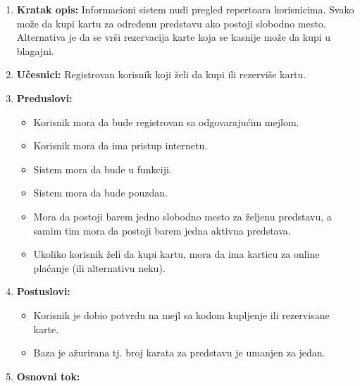 \documentclass[a4paper]{article}
\begin{document}
\begin{enumerate}
  \item \textbf{Kratak opis:} Informacioni sistem nudi pregled repertoara korisnicima. 
        Svako može da kupi kartu za određenu predstavu ako postoji slobodno mesto.
        Alternativa je da se vrši rezervacija karte koja se kasnije može da kupi u blagajni. 
  \item \textbf{Učesnici:} Registrovan korisnik koji želi da kupi ili rezerviše kartu.
  \item \textbf{Preduslovi:} 
        \begin{itemize}
          \item Korisnik mora da bude registrovan sa odgovarajućim mejlom. 
          \item Korisnik mora da ima pristup internetu.
          \item Sistem mora da bude u funkciji.
          \item Sistem mora da bude pouzdan. 
          \item Mora da postoji barem jedno slobodno mesto za željenu predstavu, a samim tim mora da 
                postoji barem jedna aktivna predstava. 
          \item Ukoliko korisnik želi da kupi kartu, mora da ima karticu za online plaćanje (ili 
                alternativu neku).
        \end{itemize}
  \item \textbf{Postuslovi:} 
        \begin{itemize}
          \item Korisnik je dobio potvrdu na mejl sa kodom kupljenje ili rezervisane karte.
          \item Baza je ažurirana tj. broj karata za predstavu je umanjen za jedan.
        \end{itemize}
  \item \textbf{Osnovni tok:}
\end{enumerate}
\end{document}
